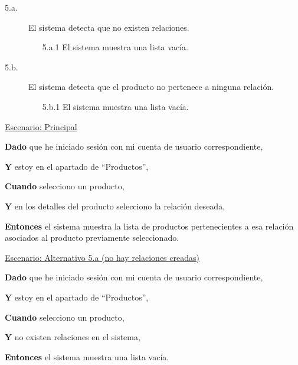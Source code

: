 \begin{description}

    \item[5.a.] El sistema detecta que no existen relaciones.
    \begin{enumerate}
        \item[5.a.1] El sistema muestra una lista vacía.
    \end{enumerate}

    \item[5.b.] El sistema detecta que el producto no pertenece a ninguna relación.
    \begin{enumerate}
        \item[5.b.1] El sistema muestra una lista vacía.
    \end{enumerate}

\end{description}

\underline{Escenario: Principal}\par
\vspace{0.15cm}
\textbf{Dado} que he iniciado sesión con mi cuenta de usuario correspondiente,\par
\textbf{Y} estoy en el apartado de \enquote{Productos},\par
\textbf{Cuando} selecciono un producto,\par
\textbf{Y} en los detalles del producto selecciono la relación deseada,\par
\textbf{Entonces} el sistema muestra la lista de productos pertenecientes a esa relación asociados al producto previamente seleccionado.\par

\vspace{0.20cm}

\underline{Escenario: Alternativo 5.a (no hay relaciones creadas)}\par
\vspace{0.15cm}
\textbf{Dado} que he iniciado sesión con mi cuenta de usuario correspondiente,\par
\textbf{Y} estoy en el apartado de \enquote{Productos},\par
\textbf{Cuando} selecciono un producto,\par
\textbf{Y} no existen relaciones en el sistema,\par
\textbf{Entonces} el sistema muestra una lista vacía.\par


